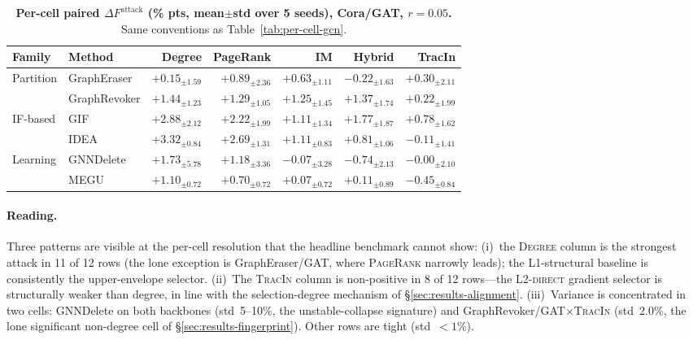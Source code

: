 \begin{table}[h]
\centering
\footnotesize
\setlength{\tabcolsep}{4pt}
\caption{\textbf{Per-cell paired $\Delta F^{\mathrm{attack}}$ (\% pts,
mean$\pm$std over 5 seeds), Cora/GAT, $r{=}0.05$.} Same conventions
as Table~\ref{tab:per-cell-gcn}.}
\label{tab:per-cell-gat}
\begin{tabular}{@{}llrrrrr@{}}
\toprule
Family & Method & Degree & PageRank & IM & Hybrid & TracIn \\
\midrule
\multirow{2}{*}{Partition}
 & GraphEraser  & $+0.15_{\pm 1.59}$ & $\mathbf{+0.89}_{\pm 2.36}$ & $+0.63_{\pm 1.11}$ & $-0.22_{\pm 1.63}$ & $+0.30_{\pm 2.11}$ \\
 & GraphRevoker & $\mathbf{+1.44}_{\pm 1.23}$ & $+1.29_{\pm 1.05}$ & $+1.25_{\pm 1.45}$ & $+1.37_{\pm 1.74}$ & $+0.22_{\pm 1.99}$ \\
\midrule
\multirow{2}{*}{IF-based}
 & GIF  & $\mathbf{+2.88}_{\pm 2.12}$ & $+2.22_{\pm 1.99}$ & $+1.11_{\pm 1.34}$ & $+1.77_{\pm 1.87}$ & $+0.78_{\pm 1.62}$ \\
 & IDEA & $\mathbf{+3.32}_{\pm 0.84}$ & $+2.69_{\pm 1.31}$ & $+1.11_{\pm 0.83}$ & $+0.81_{\pm 1.06}$ & $-0.11_{\pm 1.41}$ \\
\midrule
\multirow{2}{*}{Learning}
 & GNNDelete & $\mathbf{+1.73}_{\pm 5.78}$ & $+1.18_{\pm 3.36}$ & $-0.07_{\pm 3.28}$ & $-0.74_{\pm 2.13}$ & $-0.00_{\pm 2.10}$ \\
 & MEGU      & $\mathbf{+1.10}_{\pm 0.72}$ & $+0.70_{\pm 0.72}$ & $+0.07_{\pm 0.72}$ & $+0.11_{\pm 0.89}$ & $-0.45_{\pm 0.84}$ \\
\bottomrule
\end{tabular}
\end{table}

\paragraph{Reading.} Three patterns are visible at the per-cell
resolution that the headline benchmark cannot show: (i)~the
\textsc{Degree} column is the strongest attack in 11 of 12 rows
(the lone exception is GraphEraser/GAT, where \textsc{PageRank}
narrowly leads); the L1-structural baseline is consistently the
upper-envelope selector. (ii)~The \textsc{TracIn} column is
non-positive in 8 of 12 rows---the L2-\textsc{direct} gradient
selector is structurally weaker than degree, in line with the
selection-degree mechanism of \S\ref{sec:results-alignment}.
(iii)~Variance is concentrated in two cells: GNNDelete on both
backbones (std~5--10\%, the unstable-collapse signature) and
GraphRevoker/GAT$\times$\textsc{TracIn} (std~2.0\%, the lone
significant non-degree cell of \S\ref{sec:results-fingerprint}).
Other rows are tight (std~$<1\%$).

